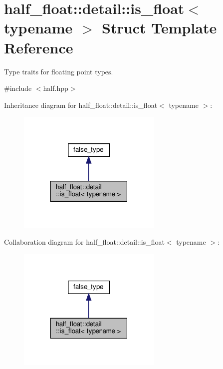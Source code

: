 \hypertarget{structhalf__float_1_1detail_1_1is__float}{}\section{half\+\_\+float\+:\+:detail\+:\+:is\+\_\+float$<$ typename $>$ Struct Template Reference}
\label{structhalf__float_1_1detail_1_1is__float}


Type traits for floating point types.  




{\ttfamily \#include $<$half.\+hpp$>$}



Inheritance diagram for half\+\_\+float\+:\+:detail\+:\+:is\+\_\+float$<$ typename $>$\+:
\nopagebreak
\begin{figure}[H]
\begin{center}
\leavevmode
\includegraphics[width=195pt]{structhalf__float_1_1detail_1_1is__float__inherit__graph}
\end{center}
\end{figure}


Collaboration diagram for half\+\_\+float\+:\+:detail\+:\+:is\+\_\+float$<$ typename $>$\+:
\nopagebreak
\begin{figure}[H]
\begin{center}
\leavevmode
\includegraphics[width=195pt]{structhalf__float_1_1detail_1_1is__float__coll__graph}
\end{center}
\end{figure}


